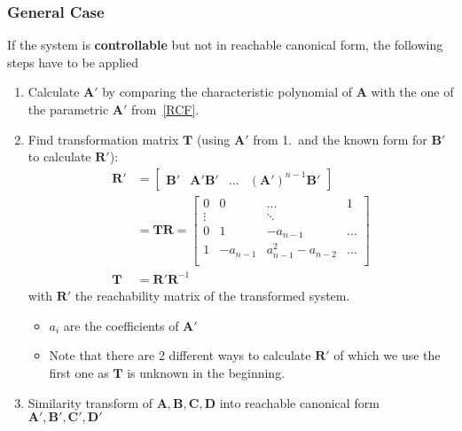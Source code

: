 \subsubsection{General Case}
If the system is \textbf{controllable} but not in reachable canonical form, the following steps have to be applied
\begin{enumerate}
    \item Calculate $\mathbf{A}'$ by comparing the characteristic polynomial of $\mathbf{A}$ with the one of the parametric $\mathbf{A}'$ from~\ref{RCF}.
    \item Find transformation matrix $\mathbf{T}$ (using $\mathbf{A}'$ from 1.\ and the known form for $\mathbf{B}'$ to calculate $\mathbf{R}'$):
          \noindent\begin{align*}
              \mathbf{R}' & =\begin{bmatrix}
                                 \mathbf{B}' & \mathbf{A}'\mathbf{B}' & \ldots & {(\mathbf{A}')}^{n-1}\mathbf{B}'
                             \end{bmatrix} \\
                          & =\mathbf{TR}  =\begin{bmatrix}
                                               0      & 0        & \dots               & 1     \\
                                               \vdots &          & \ddots              &       \\
                                               0      & 1        & -a_{n-1}            & \dots \\
                                               1      & -a_{n-1} & a_{n-1}^2 - a_{n-2} & \dots \\
                                           \end{bmatrix}                                \\
              \mathbf{T}  & = \mathbf{R'R}^{-1}
          \end{align*}
          with $\mathbf{R}'$ the reachability matrix of the transformed system.
          \begin{itemize}
            \item $a_i$ are the coefficients of $\mathbf{A}'$
            \item Note that there are 2 different ways to calculate $\mathbf{R}'$ of which we use the first one as $\mathbf{T}$ is unknown in the beginning.
          \end{itemize}
    \item Similarity transform of $\mathbf{A,B,C,D}$ into reachable canonical form $\mathbf{A',B',C',D'}$

\end{enumerate}
